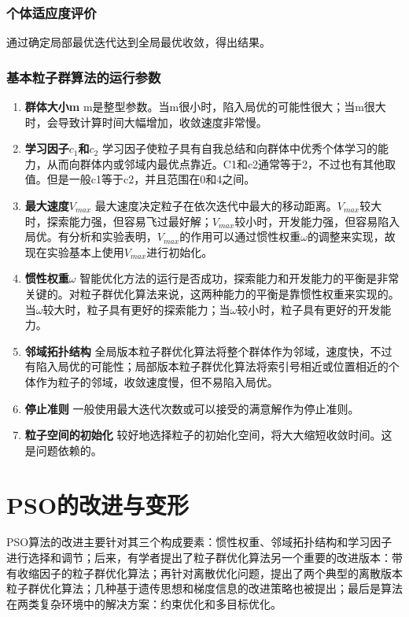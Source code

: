\subsubsection{个体适应度评价}
通过确定局部最优迭代达到全局最优收敛，得出结果。
\subsubsection{基本粒子群算法的运行参数}
\begin{enumerate}
	\item \textbf{群体大小m}
	\noindent m是整型参数。当m很小时，陷入局优的可能性很大；当m很大时，会导致计算时间大幅增加，收敛速度非常慢。
	\item \textbf{学习因子$ c_1 $和$ c_2 $}
	\noindent 学习因子使粒子具有自我总结和向群体中优秀个体学习的能力，从而向群体内或邻域内最优点靠近。C1和c2通常等于2，不过也有其他取值。但是一般c1等于c2，并且范围在0和4之间。
	\item \textbf{最大速度$V_{max}$}
	\noindent 最大速度决定粒子在依次迭代中最大的移动距离。$V_{max}$较大时，探索能力强，但容易飞过最好解；$V_{max}$较小时，开发能力强，但容易陷入局优。有分析和实验表明，$V_{max}$的作用可以通过惯性权重$\omega$的调整来实现，故现在实验基本上使用$V_{max}$进行初始化。
	\item \textbf{惯性权重$\omega$}
	\noindent 智能优化方法的运行是否成功，探索能力和开发能力的平衡是非常关键的。对粒子群优化算法来说，这两种能力的平衡是靠惯性权重来实现的。当$\omega$较大时，粒子具有更好的探索能力；当$\omega$较小时，粒子具有更好的开发能力。
	\item \textbf{邻域拓扑结构}
	\noindent 全局版本粒子群优化算法将整个群体作为邻域，速度快，不过有陷入局优的可能性；局部版本粒子群优化算法将索引号相近或位置相近的个体作为粒子的邻域，收敛速度慢，但不易陷入局优。
	\item \textbf{停止准则}
	\noindent 一般使用最大迭代次数或可以接受的满意解作为停止准则。
	\item \textbf{粒子空间的初始化}
	\noindent 较好地选择粒子的初始化空间，将大大缩短收敛时间。这是问题依赖的。
\end{enumerate}
\section{PSO的改进与变形}
PSO算法的改进主要针对其三个构成要素：惯性权重、邻域拓扑结构和学习因子进行选择和调节；后来，有学者提出了粒子群优化算法另一个重要的改进版本：带有收缩因子的粒子群优化算法\cite{Bui2007A}；再针对离散优化问题，提出了两个典型的离散版本粒子群优化算法\cite{Kennedy2002A}；几种基于遗传思想\cite{Wu2009An}和梯度信息的改进策略\cite{Fei2013An}也被提出\cite{Leboucher2018An}\cite{Gong2017Genetic}；最后是算法在两类复杂环境中的解决方案：约束优化和多目标优化\cite{Lei2008A}。
